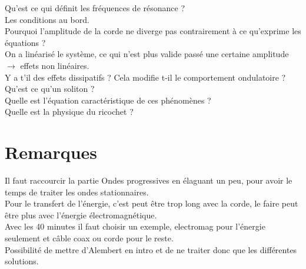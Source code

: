 \documentclass[12pt,prb,aps,epsf]{article}
\begin{document}
Qu'est ce qui définit les fréquences de résonance ?\\
Les conditions au bord.\\

Pourquoi l'amplitude de la corde ne diverge pas contrairement à ce qu'exprime les équations ?\\
On a linéarisé le système, ce qui n'est plus valide passé une certaine amplitude $\rightarrow$ effets non linéaires.\\

Y a t'il des effets dissipatifs ? Cela modifie t-il le comportement ondulatoire ?\\

Qu'est ce qu'un soliton ?\\
Quelle est l'équation caractéristique de ces phénomènes ?\\

Quelle est la physique du ricochet ?

\section*{Remarques}
Il faut raccourcir la partie Ondes progressives en élaguant un peu, pour avoir le temps de traiter les ondes stationnaires.\\
Pour le transfert de l'énergie, c'est peut être trop long avec la corde, le faire peut être plus avec l'énergie électromagnétique.\\
Avec les 40 minutes il faut choisir un exemple, electromag pour l'énergie seulement et câble coax ou corde pour le reste.\\
Possibilité de mettre d'Alembert en intro et de ne traiter donc que les différentes solutions.
\end{document}
